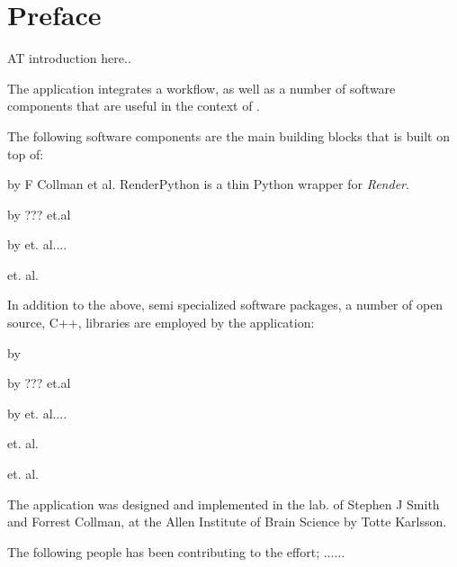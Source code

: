 
\doublespacing

\usechapterimagefalse %
\chapter*{Preface}

AT introduction here..

The \ate application integrates a workflow, as well as a number of software components that are useful in the context of \at. 

The following software components are the main building blocks that \ate is built on top of:

\begin{description}[font=$\bullet$~\normalfont\scshape\color{red!50!black}]
\item [Render Python] by F Collman et al. RenderPython is a thin Python wrapper for \emph{Render}.
\item [Render] by ??? et.al 
\item [Fiji] by et. al....
\item [Docker] et. al.
\end{description}

In addition to the above, semi specialized software packages, a number of open source, C++, libraries are employed by the \ate application:

\begin{description}[font=$\bullet$~\normalfont\scshape\color{red!50!black}]
\item [VTK] by 
\item [Poco] by ??? et.al 
\item [libCURL] by et. al....
\item [TinyXML2] et. al.
\item [Dune Scientific Library (dsl) ] et. al.
\end{description}

The \ate application was designed and implemented in the lab. of  Stephen J Smith and Forrest Collman, at the Allen Institute of Brain Science by Totte Karlsson.

The following people has been contributing to the effort; ......


\cleardoublepage
